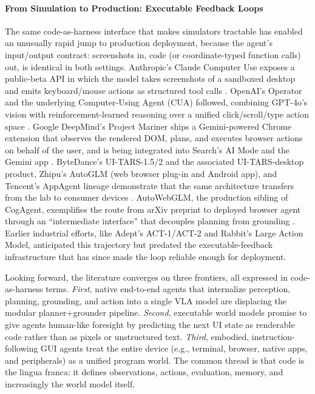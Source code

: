\paragraph{From Simulation to Production: Executable Feedback Loops}

The same code-as-harness interface that makes simulators tractable has enabled an unusually rapid jump to production deployment, because the agent's input/output contract: screenshots in, code (or coordinate-typed function calls) out, is identical in both settings. Anthropic's Claude Computer Use exposes a public-beta API in which the model takes screenshots of a sandboxed desktop and emits keyboard/mouse actions as structured tool calls \citep{anthropic2024computeruse}. OpenAI's Operator and the underlying Computer-Using Agent (CUA) followed, combining GPT-4o's vision with reinforcement-learned reasoning over a unified click/scroll/type action space \citep{openai2025operator}. Google DeepMind's Project Mariner ships a Gemini-powered Chrome extension that observes the rendered DOM, plans, and executes browser actions on behalf of the user, and is being integrated into Search's AI Mode and the Gemini app \citep{deepmind2025mariner}. ByteDance's UI-TARS-1.5/2 and the associated UI-TARS-desktop product, Zhipu's AutoGLM (web browser plug-in and Android app), and Tencent's AppAgent lineage demonstrate that the same architecture transfers from the lab to consumer devices \citep{qin2025uitarspioneeringautomatedgui,liu2024autoglmautonomousfoundationagents,zhang2023appagentmultimodalagentssmartphone}. AutoWebGLM, the production sibling of CogAgent, exemplifies the route from arXiv preprint to deployed browser agent through an ``intermediate interface'' that decouples planning from grounding \citep{lai2024autowebglmlargelanguagemodelbased}. Earlier industrial efforts, like Adept's ACT-1/ACT-2 and Rabbit's Large Action Model, anticipated this trajectory but predated the executable-feedback infrastructure that has since made the loop reliable enough for deployment.

Looking forward, the literature converges on three frontiers, all expressed in code-as-harness terms. \textit{First}, native end-to-end agents that internalize perception, planning, grounding, and action into a single VLA model are displacing the modular planner+grounder pipeline. \textit{Second}, executable world models promise to give agents human-like foresight by predicting the next UI state as renderable code rather than as pixels or unstructured text. \textit{Third}, embodied, instruction-following GUI agents treat the entire device (e.g., terminal, browser, native apps, and peripherals) as a unified program world. The common thread is that code is the lingua franca: it defines observations, actions, evaluation, memory, and increasingly the world model itself.


